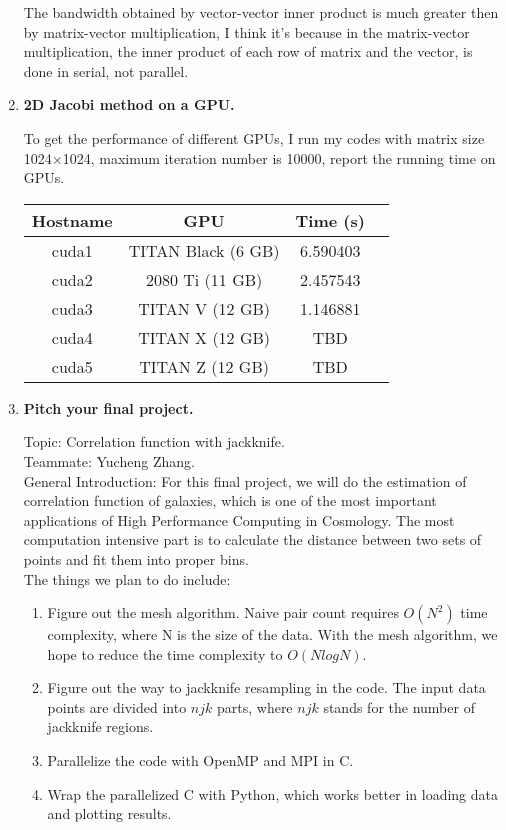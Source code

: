 \documentclass[12pt]{article}
\begin{document}
\begin{enumerate}
The bandwidth obtained by vector-vector inner product is much greater then by matrix-vector multiplication, I think it's because in the matrix-vector multiplication, the inner product of each row of matrix and the vector, is done in serial, not parallel.
  
\item {\bf 2D Jacobi method on a GPU.}
  
  To get the performance of different GPUs, I run my codes with matrix size 1024$\times$1024, maximum iteration number is 10000, report the running time on GPUs.
 \begin{center}
\begin{tabular}{ |c|c|c|c| } 
 \hline
 Hostname    &   GPU   &    Time (s) \\
 \hline
        cuda1   & TITAN Black (6 GB)  &  6.590403 \\
       cuda2   &  2080 Ti (11 GB) & 2.457543 \\
        cuda3  & TITAN V (12 GB)  & 1.146881  \\
       cuda4  &  TITAN X (12 GB)  &  TBD  \\
       cuda5  & TITAN Z (12 GB) &  TBD \\
  \hline
\end{tabular}
\end{center}
  

\item {\bf Pitch your final project.}  

Topic: Correlation function with jackknife.\\

Teammate: Yucheng Zhang.\\

General Introduction: For this final project, we will do the estimation of correlation function of galaxies, which is one of the most important applications of High Performance Computing in Cosmology. The most computation intensive part is to calculate the distance between two sets of points and fit them into proper bins. \\

The things we plan to do include:
\begin{enumerate}
\item Figure out the mesh algorithm. Naive pair count requires $O(N^2)$ time complexity, where N is the size of the data. With the mesh algorithm, we hope to reduce the time complexity to $O(NlogN)$.
\item Figure out the way to jackknife resampling in the code. The input data points are divided into $njk$ parts, where $njk$ stands for the number of jackknife regions.
\item Parallelize the code with OpenMP and MPI in C.
\item Wrap the parallelized C with Python, which works better in loading data and plotting results.
\end{enumerate}

\end{enumerate}
\end{document}
